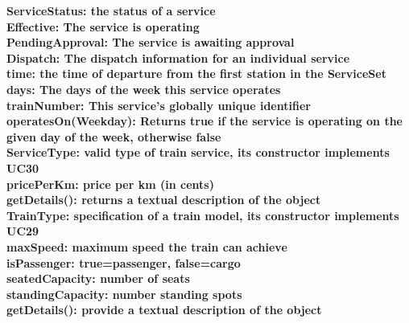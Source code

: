 \bf{ServiceStatus}: the status of a service\\

Effective: The service is operating\\
PendingApproval: The service is awaiting approval\\

\bf{Dispatch}: The dispatch information for an individual service\\

time: the time of departure from the first station in the ServiceSet\\
days: The days of the week this service operates \\
trainNumber: This service's globally unique identifier\\
operatesOn(Weekday): Returns true if the service is operating on the given day of the week, otherwise false\\

\bf{ServiceType}: valid type of train service, its constructor implements UC30\\

pricePerKm: price per km (in cents)\\
getDetails(): returns a textual description of the object\\

\bf{TrainType}: specification of a train model, its constructor implements UC29\\

maxSpeed: maximum speed the train can achieve\\
isPassenger: true=passenger, false=cargo\\
seatedCapacity: number of seats\\
standingCapacity: number standing spots\\
getDetails(): provide a textual description of the object\\


\newpage
